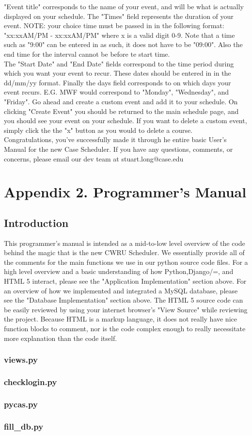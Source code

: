 \documentclass[pdftex,12pt,letter]{article}
\begin{document}
"Event title" corresponds to the name of your event, and will be what is actually displayed on your schedule. The "Times" field represents the duration of your event. NOTE: your choice time must be passed in in the following format: "xx:xxAM/PM - xx:xxAM/PM" where x is a valid digit 0-9. Note that a time such as "9:00" can be entered in as such, it does not have to be "09:00". Also the end time for the interval cannot be before te start time.\\

The "Start Date" and "End Date" fields correspond to the time period during which you want your event to recur. These dates should be entered in in the dd/mm/yy format. Finally the days field corresponds to on which days your event recurs. E.G. MWF would correspond to "Monday", "Wednesday", and "Friday". Go ahead and create a custom event and add it to your schedule. On clicking "Create Event" you should be returned to the main schedule page, and you should see your event on your schedule. If you want to delete a custom event, simply click the the "x" button as you would to delete a course.\\

Congratulations, you've successfully made it through he entire basic User's Manual for the new Case Scheduler. If you have any questions, comments, or concerns, please email our dev team at stuart.long@case.edu

\section{Appendix 2. Programmer's Manual}
\subsection{Introduction}
This programmer's manual is intended as a mid-to-low level overview of the code behind the magic that is the new CWRU Scheduler. We essentially provide all of the comments for the main functions we use in our python source code files. For a high level overview and a basic understanding of how Python,Django/=, and HTML 5 interact, please see the "Application Implementation" section above. For an overview of how we implemented and integrated a MySQL database, please see the "Database Implementation" section above. The HTML 5 source code can be easily reviewed by using your internet browser's "View Source" while reviewing the project. Because HTML is a markup language, it does not really have nice function blocks to comment, nor is the code complex enough to really necessitate more explanation than the code itself.
\subsubsection*{views.py}

\subsubsection*{checklogin.py}

\subsubsection*{pycas.py}

\subsubsection*{fill\_db.py}

\end{document}
